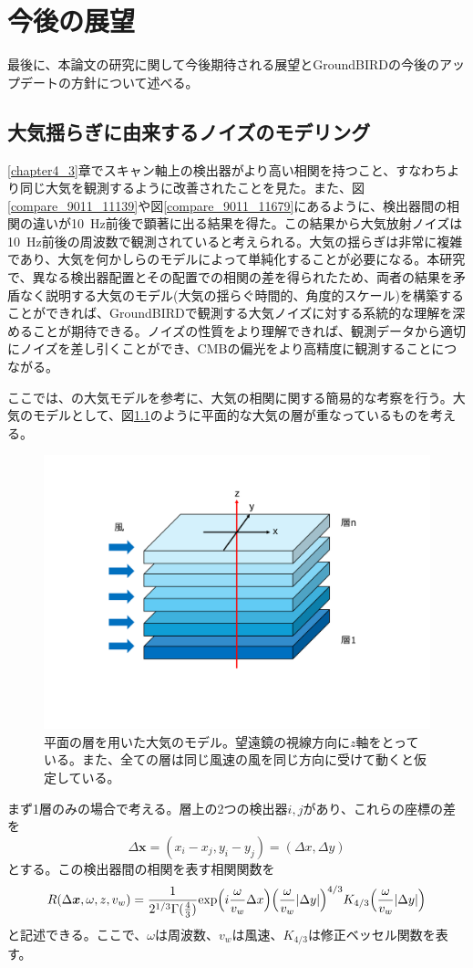 \chapter{今後の展望}
\label{chapter5}
最後に、本論文の研究に関して今後期待される展望とGroundBIRDの今後のアップデートの方針について述べる。
\section{大気揺らぎに由来するノイズのモデリング}
\label{atmos_model}
\ref{chapter4_3}章でスキャン軸上の検出器がより高い相関を持つこと、すなわちより同じ大気を観測するように改善されたことを見た。また、図\ref{compare_9011_11139}や図\ref{compare_9011_11679}にあるように、検出器間の相関の違いが\SI{10}{Hz}前後で顕著に出る結果を得た。この結果から大気放射ノイズは\SI{10}{Hz}前後の周波数で観測されていると考えられる。大気の揺らぎは非常に複雑であり、大気を何かしらのモデルによって単純化することが必要になる。本研究で、異なる検出器配置とその配置での相関の差を得られたため、両者の結果を矛盾なく説明する大気のモデル(大気の揺らぐ時間的、角度的スケール)を構築することができれば、GroundBIRDで観測する大気ノイズに対する系統的な理解を深めることが期待できる。ノイズの性質をより理解できれば、観測データから適切にノイズを差し引くことができ、CMBの偏光をより高精度に観測することにつながる。

ここでは、\cite{nishinomiya}の大気モデルを参考に、大気の相関に関する簡易的な考察を行う。大気のモデルとして、図\ref{atmos_layer}のように平面的な大気の層が重なっているものを考える。

\begin{figure}[htbp]
  \centering
  \includegraphics[width=0.7\columnwidth]{6_prospect/figs/atmos_layer.pdf}
  \caption{平面の層を用いた大気のモデル。望遠鏡の視線方向に$z$軸をとっている。また、全ての層は同じ風速の風を同じ方向に受けて動くと仮定している。}
  \label{atmos_layer}
\end{figure}
まず1層のみの場合で考える。層上の2つの検出器$i, j$があり、これらの座標の差を
\begin{equation}
  \Delta\bm{x} = (x_{i} -x_{j}, y_{i} - y_{j}) = (\Delta x, \Delta y)
\end{equation}
とする。この検出器間の相関を表す相関関数を
\begin{equation}
  R(\Delta\bm{x},\omega,z, v_{w}) = \frac{1}{2^{1/3}\Gamma(\frac{4}{3})}\mathrm{exp}\Bigl(i\frac{\omega}{v_{w}}\Delta x\Bigr)\Bigl(\frac{\omega}{v_{w}}|\Delta y|\Bigr)^{4/3}K_{4/3}\Bigl(\frac{\omega}{v_{w}}|\Delta y|\Bigr)
\end{equation}
と記述できる。ここで、$\omega$は周波数、$v_{w}$は風速、$K_{4/3}$は修正ベッセル関数を表す。

